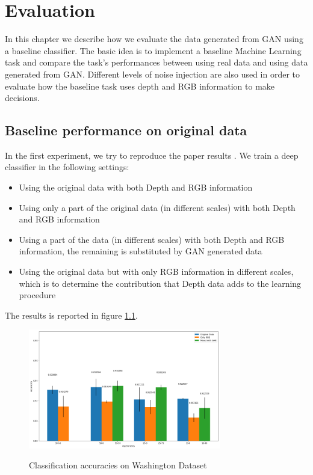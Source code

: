 
\chapter{Evaluation\label{cha:evaluation}}
In this chapter we describe how we evaluate the data generated from GAN using a baseline
classifier. The basic idea is to implement a baseline Machine Learning task and compare
the task's performances between using real data and using data generated from GAN.
Different levels of noise injection are also used in order to evaluate how the
baseline task uses depth and RGB information to make decisions.


\section{Baseline performance on original data}
In the first experiment, we try to reproduce the paper results . We train
a deep classifier in the following settings:

\begin{itemize}
		\item Using the original data with both Depth and RGB information
		\item Using only a part of the original data (in different scales) with both Depth and RGB information
		\item Using a part of the data (in different scales) with both Depth and RGB
			information, the remaining is substituted
			by GAN generated data
		\item Using the original data but with only RGB information in different scales,
			which is to determine the contribution that Depth data adds to the learning
			procedure
\end{itemize}

The results is reported in figure \ref{fig:eitel_accuracies}.

\begin{figure}[h]
	\caption{Classification accuracies on Washington Dataset}
	\centering
	\includegraphics[width=0.75\textwidth]{img/eitel_accuracies}
	\label{fig:eitel_accuracies}
\end{figure}

